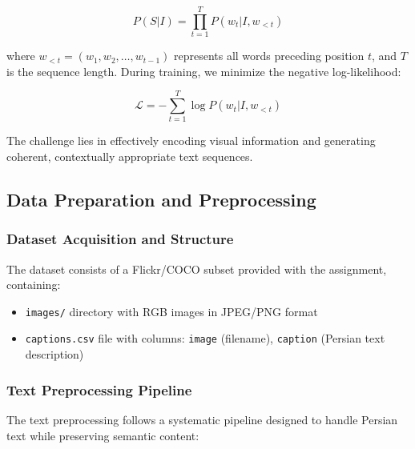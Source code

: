 \documentclass[conference]{IEEEtran}
\begin{document}
\begin{equation}
P(S|I) = \prod_{t=1}^{T} P(w_t | I, w_{<t})
\end{equation}

where $w_{<t} = (w_1, w_2, \dots, w_{t-1})$ represents all words preceding position $t$, and $T$ is the sequence length. During training, we minimize the negative log-likelihood:

\begin{equation}
\mathcal{L} = -\sum_{t=1}^{T} \log P(w_t | I, w_{<t})
\end{equation}

The challenge lies in effectively encoding visual information and generating coherent, contextually appropriate text sequences.

\subsection{Data Preparation and Preprocessing}
\label{sec:q1_data}

\subsubsection{Dataset Acquisition and Structure}
The dataset consists of a Flickr/COCO subset provided with the assignment, containing:
\begin{itemize}
  \item \texttt{images/} directory with RGB images in JPEG/PNG format
  \item \texttt{captions.csv} file with columns: \texttt{image} (filename), \texttt{caption} (Persian text description)
\end{itemize}

\subsubsection{Text Preprocessing Pipeline}
\label{sec:q1_text_preprocessing}

The text preprocessing follows a systematic pipeline designed to handle Persian text while preserving semantic content:
\end{document}
